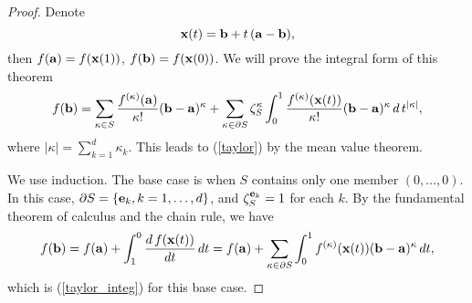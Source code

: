 \begin{proof}
Denote \[ \mathbf{x}(t) = \mathbf{b} + t\,(\mathbf{a}-\mathbf{b}), \]
then $f(\mathbf{a}) = f(\mathbf{x}(1))$, $f(\mathbf{b}) = f(\mathbf{x}(0))$.
We will prove the integral form of this theorem
\begin{equation} \label{taylor_integ}
   f(\mathbf{b}) = \sum_{\kappa\in S} \frac{f^{(\kappa)}(\mathbf{a})}{\kappa!} (\mathbf{b}-\mathbf{a})^\kappa
         + \sum_{\kappa\in \partial S} \zeta^\kappa_S \int_0^1
           \frac{f^{(\kappa)}(\mathbf{x}(t))}{\kappa!} (\mathbf{b}-\mathbf{a})^\kappa \,d\,t^{|\kappa|}
,\end{equation}
where $|\kappa| = \sum_{k=1}^d \kappa_k$.
This leads to (\ref{taylor}) by the mean value theorem.

We use induction.  The base case is when $S$ contains only one member
$(0,\ldots,0)$.  In this case, $\partial S = \{ \mathbf{e}_k, k = 1,\ldots,d \}$,
and $\zeta^{\mathbf{e}_k}_S = 1$ for each $k$.
By the fundamental theorem of calculus and the chain rule, we have
\[ f(\mathbf{b}) = f(\mathbf{a}) + \int_1^0 \frac{d\,f(\mathbf{x}(t))}{dt} \,dt
         = f(\mathbf{a}) + \sum_{\kappa\in \partial S}
                   \int_0^1 f^{(\kappa)}(\mathbf{x}(t)) (\mathbf{b}-\mathbf{a})^\kappa \,dt , \]
which is (\ref{taylor_integ}) for this base case.


\end{proof}
